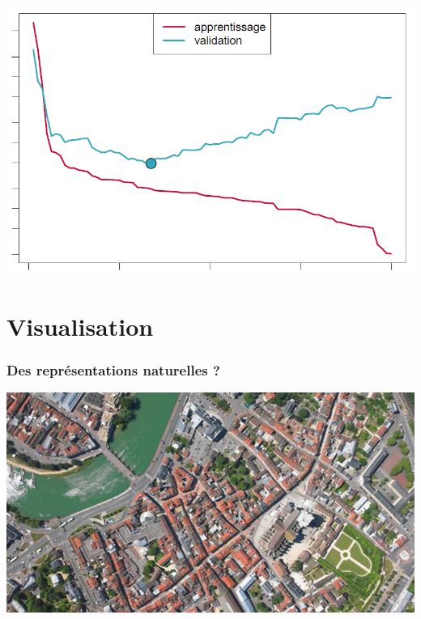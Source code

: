 \documentclass[11pt]{beamer}
\newenvironment{slide}[1]{%
\begin{frame}[environment=slide]
\frametitle{#1}
}{%
\end{frame}
}
\begin{document}
\begin{slide}{}

\includegraphics[scale=0.3]{testvalidation}

\end{slide}

\section{Visualisation}

\begin{slide}{Des représentations naturelles ?}

\includegraphics[scale=0.5]{meaux}


\end{slide}
\end{document}
